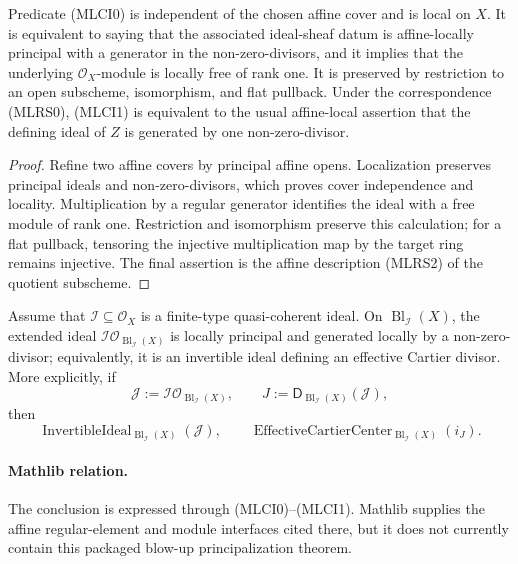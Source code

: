 \begin{lemma}
  \label{lemma:nagata-invertible-ideal-effective-cartier}

  Predicate (MLCI0) is independent of the chosen affine cover and is local
  on $X$.  It is equivalent to saying that the associated ideal-sheaf datum
  is affine-locally principal with a generator in the non-zero-divisors, and
  it implies that the underlying $\mathcal O_X$-module is locally free of
  rank one.  It is preserved by restriction to an open subscheme,
  isomorphism, and flat pullback.  Under the correspondence (MLRS0), (MLCI1)
  is equivalent to the usual affine-local assertion that the defining ideal
  of $Z$ is generated by one non-zero-divisor.
\end{lemma}

\begin{proof}
  Refine two affine covers by principal affine opens.  Localization preserves
  principal ideals and non-zero-divisors, which proves cover independence
  and locality.  Multiplication by a regular generator identifies the ideal
  with a free module of rank one.  Restriction and isomorphism preserve this
  calculation; for a flat pullback, tensoring the injective multiplication
  map by the target ring remains injective.  The final assertion is the
  affine description (MLRS2) of the quotient subscheme.
\end{proof}

\begin{theorem}
  \label{thm:nagata-blowup-principalizes-center}
  \lean{}

  Assume that $\mathcal I\subseteq\mathcal O_X$ is a finite-type
  quasi-coherent ideal.  On $\operatorname{Bl}_{\mathcal I}(X)$, the extended ideal
  $\mathcal I\mathcal O_{\operatorname{Bl}_{\mathcal I}(X)}$ is locally
  principal and generated locally by a non-zero-divisor; equivalently, it is
  an
  invertible ideal defining an effective Cartier divisor.
  More explicitly, if
  \[
    \mathcal J:=
      \mathcal I\mathcal O_{\operatorname{Bl}_{\mathcal I}(X)},
    \qquad J:=\mathsf D_{\operatorname{Bl}_{\mathcal I}(X)}(\mathcal J),
  \]
  then
  \[
    \operatorname{InvertibleIdeal}_{\operatorname{Bl}_{\mathcal I}(X)}
      (\mathcal J),
    \qquad
    \operatorname{EffectiveCartierCenter}_{\operatorname{Bl}_{\mathcal I}(X)}
      (i_J).
  \]

  \paragraph{Mathlib relation.}
  The conclusion is expressed through (MLCI0)--(MLCI1).  Mathlib supplies
  the affine regular-element and module interfaces cited there, but it does
  not currently contain this packaged blow-up principalization theorem.
\end{theorem}

